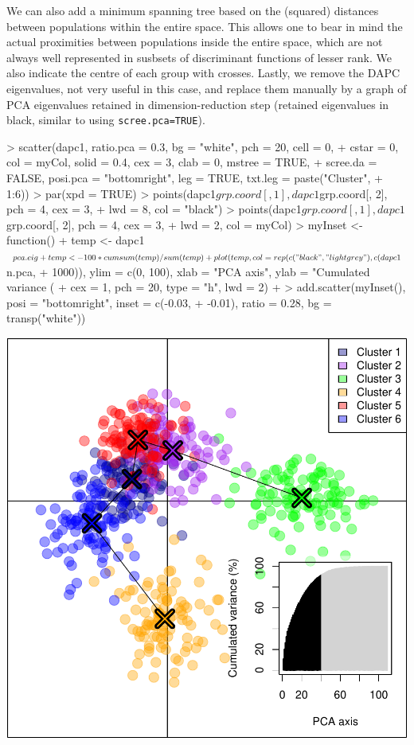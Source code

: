\documentclass{article}
\begin{document}
We can also add a minimum spanning tree based on the (squared) distances between populations within the
entire space.
This allows one to bear in mind the actual proximities between populations inside the entire space, which are not always
well represented in susbsets of discriminant functions of lesser rank.
We also indicate the centre of each group with crosses.
Lastly, we remove the DAPC eigenvalues, not very useful in this case, and replace them manually by a graph of
PCA eigenvalues retained in dimension-reduction step (retained eigenvalues in black, similar to
using \texttt{scree.pca=TRUE}).
\begin{Schunk}
\begin{Sinput}
> scatter(dapc1, ratio.pca = 0.3, bg = "white", pch = 20, cell = 0, 
+     cstar = 0, col = myCol, solid = 0.4, cex = 3, clab = 0, mstree = TRUE, 
+     scree.da = FALSE, posi.pca = "bottomright", leg = TRUE, txt.leg = paste("Cluster", 
+         1:6))
> par(xpd = TRUE)
> points(dapc1$grp.coord[, 1], dapc1$grp.coord[, 2], pch = 4, cex = 3, 
+     lwd = 8, col = "black")
> points(dapc1$grp.coord[, 1], dapc1$grp.coord[, 2], pch = 4, cex = 3, 
+     lwd = 2, col = myCol)
> myInset <- function() {
+     temp <- dapc1$pca.eig
+     temp <- 100 * cumsum(temp)/sum(temp)
+     plot(temp, col = rep(c("black", "lightgrey"), c(dapc1$n.pca, 
+         1000)), ylim = c(0, 100), xlab = "PCA axis", ylab = "Cumulated variance (%
+         cex = 1, pch = 20, type = "h", lwd = 2)
+ }
> add.scatter(myInset(), posi = "bottomright", inset = c(-0.03, 
+     -0.01), ratio = 0.28, bg = transp("white"))
\end{Sinput}
\end{Schunk}
\includegraphics{figs/dapc-014}
\end{document}
